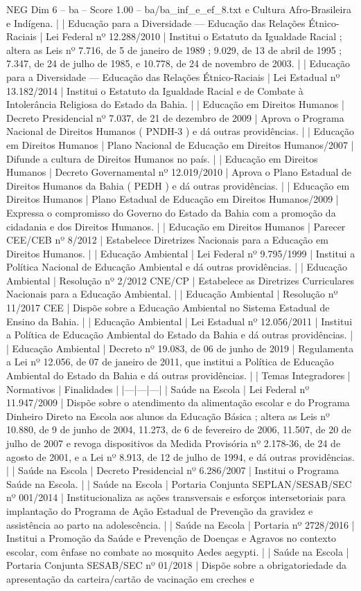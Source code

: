 \begin{textsample}{NEG Dim 6 – ba – Score 1.00 – ba/ba\_inf\_e\_ef\_8.txt}
e Cultura Afro-Brasileira e Indígena. | | Educação para a Diversidade — Educação das Relações Étnico-Raciais | Lei Federal nº 12.288/2010 | Institui o Estatuto da Igualdade Racial ; altera as Leis nº 7.716, de 5 de janeiro de 1989 ; 9.029, de 13 de abril de 1995 ; 7.347, de 24 de julho de 1985, e 10.778, de 24 de novembro de 2003. | | Educação para a Diversidade — Educação das Relações Étnico-Raciais | Lei Estadual nº 13.182/2014 | Institui o Estatuto da Igualdade Racial e de Combate à Intolerância Religiosa do Estado da Bahia. | | Educação em Direitos Humanos | Decreto Presidencial nº 7.037, de 21 de dezembro de 2009 | Aprova o Programa Nacional de Direitos Humanos ( PNDH-3 ) e dá outras providências. | | Educação em Direitos Humanos | Plano Nacional de Educação em Direitos Humanos/2007 | Difunde a cultura de Direitos Humanos no país. | | Educação em Direitos Humanos | Decreto Governamental nº 12.019/2010 | Aprova o Plano Estadual de Direitos Humanos da Bahia ( PEDH ) e dá outras providências. | | Educação em Direitos Humanos | Plano Estadual de Educação em Direitos Humanos/2009 | Expressa o compromisso do Governo do Estado da Bahia com a promoção da cidadania e dos Direitos Humanos. | | Educação em Direitos Humanos | Parecer CEE/CEB nº 8/2012 | Estabelece Diretrizes Nacionais para a Educação em Direitos Humanos. | | Educação Ambiental | Lei Federal nº 9.795/1999 | Institui a Política Nacional de Educação Ambiental e dá outras providências. | | Educação Ambiental | Resolução nº 2/2012 CNE/CP | Estabelece as Diretrizes Curriculares Nacionais para a Educação Ambiental. | | Educação Ambiental | Resolução nº 11/2017 CEE | Dispõe sobre a Educação Ambiental no Sistema Estadual de Ensino da Bahia. | | Educação Ambiental | Lei Estadual nº 12.056/2011 | Institui a Política de Educação Ambiental do Estado da Bahia e dá outras providências. | | Educação Ambiental | Decreto nº 19.083, de 06 de junho de 2019 | Regulamenta a Lei nº 12.056, de 07 de janeiro de 2011, que institui a Política de Educação Ambiental do Estado da Bahia e dá outras providências. | | Temas Integradores | Normativos | Finalidades | |---|---|---| | Saúde na Escola | Lei Federal nº 11.947/2009 | Dispõe sobre o atendimento da alimentação escolar e do Programa Dinheiro Direto na Escola aos alunos da Educação Básica ; altera as Leis nº 10.880, de 9 de junho de 2004, 11.273, de 6 de fevereiro de 2006, 11.507, de 20 de julho de 2007 e revoga dispositivos da Medida Provisória nº 2.178-36, de 24 de agosto de 2001, e a Lei nº 8.913, de 12 de julho de 1994, e dá outras providências. | | Saúde na Escola | Decreto Presidencial nº 6.286/2007 | Institui o Programa Saúde na Escola. | | Saúde na Escola | Portaria Conjunta SEPLAN/SESAB/SEC nº 001/2014 | Institucionaliza as ações transversais e esforços intersetoriais para implantação do Programa de Ação Estadual de Prevenção da gravidez e assistência ao parto na adolescência. | | Saúde na Escola | Portaria nº 2728/2016 | Institui a Promoção da Saúde e Prevenção de Doenças e Agravos no contexto escolar, com ênfase no combate ao mosquito Aedes aegypti. | | Saúde na Escola | Portaria Conjunta SESAB/SEC nº 01/2018 | Dispõe sobre a obrigatoriedade da apresentação da carteira/cartão de vacinação em creches e 
\end{textsample}
